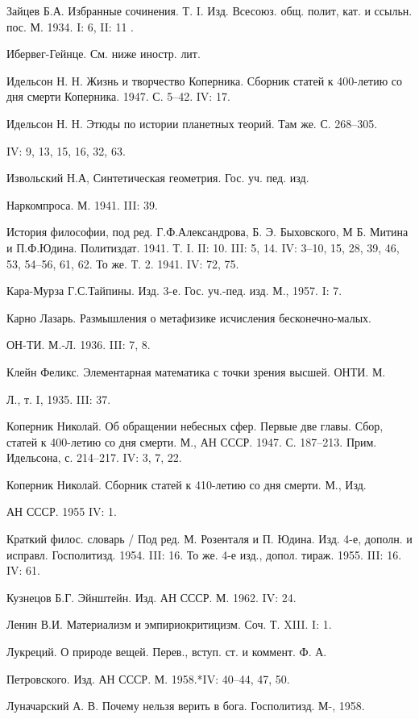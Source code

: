 Зайцев Б.А. Избранные сочинения. Т.  I. Изд. Всесоюз. общ. полит, кат.
и ссыльн. пос. М. 1934. I: 6, II: 11                                 .

Ибервег-Гейнце. См. ниже иностр. лит.

Идельсон  Н.  Н.  Жизнь  и  творчество  Коперника.  Сборник  статей  к
400-летию со дня смерти Коперника. 1947. С. 5--42. IV: 17.

Идельсон Н. Н. Этюды по истории планетных теорий. Там же. С. 268--305.

IV: 9, 13, 15, 16, 32, 63.

Извольский Н.А, Синтетическая геометрия. Гос. уч. пед. изд.

Наркомпроса. М. 1941. III: 39.

История философии, под  ред. Г.Ф.Александрова, Б. Э.  Быховского, М Б.
Митина и  П.Ф.Юдина. Политиздат. 1941. Т.  I. II: 10. III:  5, 14. IV:
3--10, 15, 28, 39, 46, 53, 54--56, 61,  62. То же. Т. 2. 1941. IV: 72,
75.

Кара-Мурза Г.С.Тайпины. Изд. 3-е. Гос. уч.-пед. изд. М., 1957. I: 7.

Карно Лазарь. Размышления о метафизике исчисления бесконечно-малых.

ОН-ТИ. М.-Л. 1936. III: 7, 8.

Клейн Феликс. Элементарная математика с точки зрения высшей. ОНТИ. М.

Л., т. I, 1935. III: 37.

Коперник Николай. Об обращении небесных  сфер. Первые две главы. Сбор,
статей к  400-летию со  дня смерти.  М., АН  СССР. 1947.  С. 187--213.
Прим. Идельсона, с. 214--217. IV: 3, 7, 22.

Коперник Николай. Сборник статей к 410-летию со дня смерти. М., Изд.

АН СССР. 1955 IV: 1.

Краткий филос. словарь  / Под ред. М. Розенталя и  П. Юдина. Изд. 4-е,
дополн. и исправл. Госполитизд. 1954. III: 16. То же. 4-е изд., допол.
тираж. 1955. III: 16. IV: 61.

Кузнецов Б.Г. Эйнштейн. Изд. АН СССР. М. 1962. IV: 24.

Ленин В.И. Материализм и эмпириокритицизм. Соч. Т. XIII. I: 1.

Лукреций. О природе вещей. Перев., вступ. ст. и коммент. Ф. А.

Петровского. Изд. АН СССР. М. 1958.*IV: 40--44, 47, 50.

Луначарский А. В. Почему нельзя верить в бога. Госполитизд. М-, 1958.

